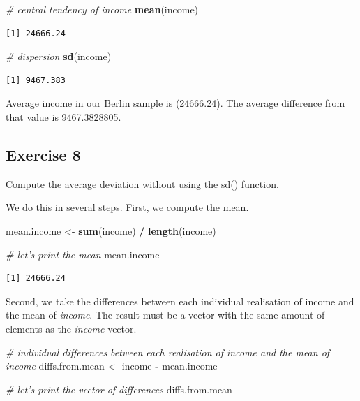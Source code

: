\documentclass[]{book}
\newenvironment{Shaded}{\begin{snugshade}}{\end{snugshade}}
\newcommand{\KeywordTok}[1]{\textcolor[rgb]{0.13,0.29,0.53}{\textbf{#1}}}
\newcommand{\StringTok}[1]{\textcolor[rgb]{0.31,0.60,0.02}{#1}}
\newcommand{\CommentTok}[1]{\textcolor[rgb]{0.56,0.35,0.01}{\textit{#1}}}
\newcommand{\OperatorTok}[1]{\textcolor[rgb]{0.81,0.36,0.00}{\textbf{#1}}}
\newcommand{\NormalTok}[1]{#1}
\theoremstyle{definition}
\theoremstyle{definition}
\theoremstyle{definition}
\theoremstyle{remark}
\begin{document}
\begin{Shaded}
\begin{Highlighting}[]
\CommentTok{# central tendency of income}
\KeywordTok{mean}\NormalTok{(income)}
\end{Highlighting}
\end{Shaded}

\begin{verbatim}
[1] 24666.24
\end{verbatim}

\begin{Shaded}
\begin{Highlighting}[]
\CommentTok{# dispersion}
\KeywordTok{sd}\NormalTok{(income)}
\end{Highlighting}
\end{Shaded}

\begin{verbatim}
[1] 9467.383
\end{verbatim}

Average income in our Berlin sample is (24666.24). The average
difference from that value is 9467.3828805.

\subsection{Exercise 8}\label{exercise-8}

Compute the average deviation without using the sd() function.

We do this in several steps. First, we compute the mean.

\begin{Shaded}
\begin{Highlighting}[]
\NormalTok{mean.income <-}\StringTok{ }\KeywordTok{sum}\NormalTok{(income) }\OperatorTok{/}\StringTok{ }\KeywordTok{length}\NormalTok{(income)}

\CommentTok{# let's print the mean}
\NormalTok{mean.income}
\end{Highlighting}
\end{Shaded}

\begin{verbatim}
[1] 24666.24
\end{verbatim}

Second, we take the differences between each individual realisation of
income and the mean of \emph{income}. The result must be a vector with
the same amount of elements as the \emph{income} vector.

\begin{Shaded}
\begin{Highlighting}[]
\CommentTok{# individual differences between each realisation of income and the mean of income}
\NormalTok{diffs.from.mean <-}\StringTok{ }\NormalTok{income }\OperatorTok{-}\StringTok{ }\NormalTok{mean.income}

\CommentTok{# let's print the vector of differences}
\NormalTok{diffs.from.mean}
\end{Highlighting}
\end{Shaded}
\end{document}

